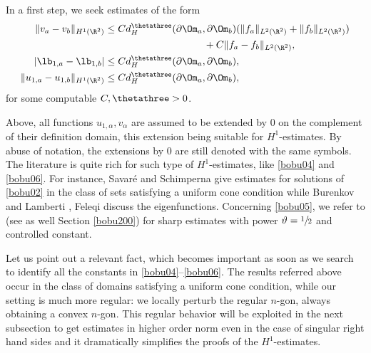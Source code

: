 In a first step, we seek estimates of the form
\begin{align}\label{bobu04}
\|v_a-v_b\|_{H^1(\R^2)}&\le Cd_H^{\thetathree}(\partial \Om_a, \partial \Om_b)(\|f_a\|_{L^2(\R^2)}+\|f_b\|_{L^2(\R^2)})\\
&\hspace*{3.5cm} + C\|f_a-f_b\|_{L^2(\R^2)},\notag
\\
\label{bobu05}
|\lb_{1,a}-\lb_{1,b}| &\le Cd_H^{\thetathree}(\partial \Om_a, \partial \Om_b),
\\
\label{bobu06}
\|u_{1,a}-u_{1,b}\|_{H^1(\R^2)}&\le Cd_H^{\thetathree}(\partial \Om_a, \partial \Om_b),
\end{align}
for some computable $C, \thetathree>0$.

Above, all functions $u_{1,\alpha}, v_\alpha$ are assumed to be extended by $0$ on the complement of their definition domain, this extension being suitable for $H^1$-estimates. By abuse of notation, the extensions by $0$ are still denoted with the same symbols.
The literature is quite rich for such type of $H^1$-estimates, like \eqref{bobu04} and \eqref{bobu06}. For instance, Savaré and Schimperna \cite{SaSc02} give estimates for
solutions of \eqref{bobu02} in the class of sets satisfying a uniform cone condition while Burenkov and Lamberti \cite{BBL10}, Feleqi \cite{FE16} discuss the eigenfunctions. Concerning \eqref{bobu05}, we refer to \cite{Pa97} (see as well Section \ref{bobu200}) for sharp estimates with power $\vartheta =\sfrac 12$ and controlled constant.

Let us point out a relevant fact, which becomes important as soon as we search to identify all the constants in \eqref{bobu04}--\eqref{bobu06}. The results referred above occur in the class of domains satisfying a uniform cone condition, while our setting is much more regular: we locally perturb the regular $n$-gon, always obtaining a convex $n$-gon. This regular behavior will be exploited in the next subsection to get estimates in higher order norm even in the case of singular right hand sides and it dramatically simplifies the proofs of the $H^1$-estimates.

